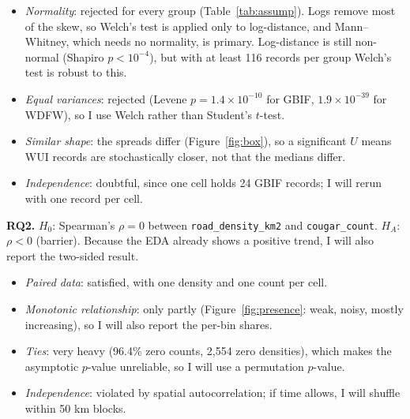 \documentclass[11pt, a4paper]{article}
\begin{document}
\begin{itemize}
  \item \emph{Normality}: rejected for every group (Table~\ref{tab:assump}). Logs remove most of the skew, so Welch's test is applied only to log-distance, and Mann--Whitney, which needs no normality, is primary. Log-distance is still non-normal (Shapiro $p<10^{-4}$), but with at least 116 records per group Welch's test is robust to this.
  \item \emph{Equal variances}: rejected (Levene $p=1.4\times10^{-10}$ for GBIF, $1.9\times10^{-39}$ for WDFW), so I use Welch rather than Student's $t$-test.
  \item \emph{Similar shape}: the spreads differ (Figure~\ref{fig:box}), so a significant $U$ means WUI records are stochastically closer, not that the medians differ.
  \item \emph{Independence}: doubtful, since one cell holds 24 GBIF records; I will rerun with one record per cell.
\end{itemize}
\noindent
\textbf{RQ2.} $H_0$: Spearman's $\rho=0$ between \texttt{road\_density\_km2} and \texttt{cougar\_count}. $H_A$: $\rho<0$ (barrier). Because the EDA already shows a positive trend, I will also report the two-sided result.
\begin{itemize}
  \item \emph{Paired data}: satisfied, with one density and one count per cell.
  \item \emph{Monotonic relationship}: only partly (Figure~\ref{fig:presence}: weak, noisy, mostly increasing), so I will also report the per-bin shares.
  \item \emph{Ties}: very heavy (96.4\% zero counts, 2,554 zero densities), which makes the asymptotic $p$-value unreliable, so I will use a permutation $p$-value.
  \item \emph{Independence}: violated by spatial autocorrelation; if time allows, I will shuffle within 50 km blocks.
\end{itemize}
\end{document}
